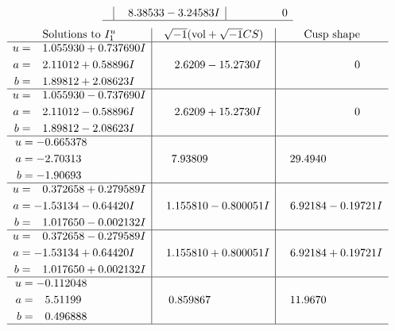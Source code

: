 \documentclass[1p]{elsarticle_modified}
\theoremstyle{definition}
\newcommand{\I}{\sqrt{-1}}
\begin{document}
$$\begin{array}{c|c|c}
 & \phantom{-}8.38533 - 3.24583 I & \phantom{-0.000000 } 0\\
 \hline 
 \end{array}$$\newpage$$\begin{array}{c|c|c}  
\text{Solutions to }I^u_{1}& \I (\text{vol} + \sqrt{-1}CS) & \text{Cusp shape}\\
 \hline 
\begin{aligned}
u &= \phantom{-}1.055930 + 0.737690 I \\
a &= \phantom{-}2.11012 + 0.58896 I \\
b &= \phantom{-}1.89812 + 2.08623 I\end{aligned}
 & \phantom{-}2.6209 - 15.2730 I & \phantom{-0.000000 } 0 \\ \hline\begin{aligned}
u &= \phantom{-}1.055930 - 0.737690 I \\
a &= \phantom{-}2.11012 - 0.58896 I \\
b &= \phantom{-}1.89812 - 2.08623 I\end{aligned}
 & \phantom{-}2.6209 + 15.2730 I & \phantom{-0.000000 } 0 \\ \hline\begin{aligned}
u &= -0.665378\phantom{ +0.000000I} \\
a &= -2.70313\phantom{ +0.000000I} \\
b &= -1.90693\phantom{ +0.000000I}\end{aligned}
 & \phantom{-}7.93809\phantom{ +0.000000I} & \phantom{-}29.4940\phantom{ +0.000000I} \\ \hline\begin{aligned}
u &= \phantom{-}0.372658 + 0.279589 I \\
a &= -1.53134 - 0.64420 I \\
b &= \phantom{-}1.017650 - 0.002132 I\end{aligned}
 & \phantom{-}1.155810 - 0.800051 I & \phantom{-}6.92184 - 0.19721 I \\ \hline\begin{aligned}
u &= \phantom{-}0.372658 - 0.279589 I \\
a &= -1.53134 + 0.64420 I \\
b &= \phantom{-}1.017650 + 0.002132 I\end{aligned}
 & \phantom{-}1.155810 + 0.800051 I & \phantom{-}6.92184 + 0.19721 I \\ \hline\begin{aligned}
u &= -0.112048\phantom{ +0.000000I} \\
a &= \phantom{-}5.51199\phantom{ +0.000000I} \\
b &= \phantom{-}0.496888\phantom{ +0.000000I}\end{aligned}
 & \phantom{-}0.859867\phantom{ +0.000000I} & \phantom{-}11.9670\phantom{ +0.000000I}\\
 \hline 
 \end{array}$$\newpage\newpage\renewcommand{\arraystretch}{1}
\end{document}
